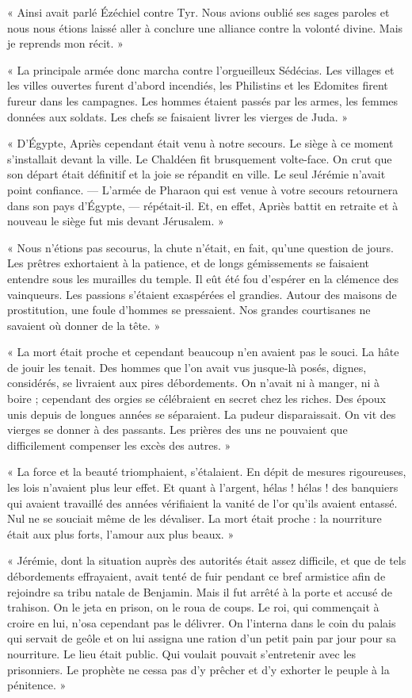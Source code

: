 \documentclass[a4paper, 11pt, oneside, polutonikogreek, french]{article}
\begin{document}
« Ainsi avait parlé Ézéchiel contre Tyr. Nous avions oublié ses sages paroles et nous nous étions laissé aller à conclure une alliance contre la volonté divine. Mais je reprends mon récit. »

« La principale armée donc marcha contre l'orgueilleux Sédécias. Les villages et les villes ouvertes furent d'abord incendiés, les Philistins et les Edomites firent fureur dans les campagnes. Les hommes étaient passés par les armes, les femmes données aux soldats. Les chefs se faisaient livrer les vierges de Juda. »

« D'Égypte, Apriès cependant était venu à notre secours. Le siège à ce moment s'installait devant la ville. Le Chaldéen fit brusquement volte-face. On crut que son départ était définitif et la joie se répandit en ville. Le seul Jérémie n'avait point confiance. --- L'armée de Pharaon qui est venue à votre secours retournera dans son pays d'Égypte, --- répétait-il. Et, en effet, Apriès battit en retraite et à nouveau le siège fut mis devant Jérusalem. »

« Nous n'étions pas secourus, la chute n'était, en fait, qu'une question de jours. Les prêtres exhortaient à la patience, et de longs gémissements se faisaient entendre sous les murailles du temple. Il eût été fou d'espérer en la clémence des vainqueurs. Les passions s'étaient exaspérées el grandies. Autour des maisons de prostitution, une foule d'hommes se pressaient. Nos grandes courtisanes ne savaient où donner de la tête. »

« La mort était proche et cependant beaucoup n'en avaient pas le souci. La hâte de jouir les tenait. Des hommes que l'on avait vus jusque-là posés, dignes, considérés, se livraient aux pires débordements. On n'avait ni à manger, ni à boire ; cependant des orgies se célébraient en secret chez les riches. Des époux unis depuis de longues années se séparaient. La pudeur disparaissait. On vit des vierges se donner à des passants. Les prières des uns ne pouvaient que difficilement compenser les excès des autres. »

« La force et la beauté triomphaient, s'étalaient. En dépit de mesures rigoureuses, les lois n'avaient plus leur effet. Et quant à l'argent, hélas ! hélas ! des banquiers qui avaient travaillé des années vérifiaient la vanité de l'or qu'ils avaient entassé. Nul ne se souciait même de les dévaliser. La mort était proche : la nourriture était aux plus forts, l'amour aux plus beaux. »

« Jérémie, dont la situation auprès des autorités était assez difficile, et que de tels débordements effrayaient, avait tenté de fuir pendant ce bref armistice afin de rejoindre sa tribu natale de Benjamin. Mais il fut arrêté à la porte et accusé de trahison. On le jeta en prison, on le roua de coups. Le roi, qui commençait à croire en lui, n'osa cependant pas le délivrer. On l'interna dans le coin du palais qui servait de geôle et on lui assigna une ration d'un petit pain par jour pour sa nourriture. Le lieu était public. Qui voulait pouvait s'entretenir avec les prisonniers. Le prophète ne cessa pas d'y prêcher et d'y exhorter le peuple à la pénitence. »
\end{document}
